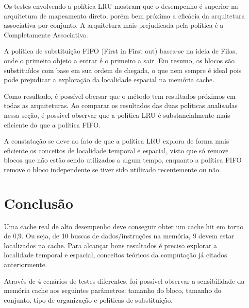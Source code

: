 \documentclass[conference]{IEEEtran}
\begin{document}
Os testes envolvendo a política LRU mostram que o desempenho é superior na arquitetura de mapeamento direto, porém bem próximo a eficácia da arquitetura associativa por conjunto. A arquitetura mais prejudicada pela política é a Completamente Associativa.


A política de substituição FIFO (First in First out) basea-se na ideia de Filas, onde o primeiro objeto a entrar é o primeiro a sair. Em resumo, os blocos são substituídos com base em sua ordem de chegada, o que nem sempre é ideal pois pode prejudicar a exploração da localidade espacial na memória cache.

Como resultado, é possível obersar que o método tem resultados próximos em todas as arquiteturas. Ao comparar os resultados das duas políticas analisadas nessa seção, é possível observar que a política LRU é substancialmente mais eficiente do que a política FIFO.

A constatação se deve ao fato de que a política LRU explora de forma mais eficiente os conceitos de localidade temporal e espacial, visto que só remove blocos que não estão sendo utilizados a algum tempo, enquanto a política FIFO remove o bloco independente se tiver sido utilizado recentemente ou não.

\section{Conclusão}
Uma cache real de alto desempenho deve conseguir obter um cache hit em torno de 0,9. Ou seja, de 10 buscas de dados/instruções na memória, 9 devem estar localizados na cache. Para alcançar bons resultados é preciso explorar a localidade temporal e espacial, conceitos teóricos da computação já citados anteriormente. 

Através de 4 cenários de testes diferentes, foi possível observar a sensibilidade da memória cache aos seguintes parâmetros: tamanho do bloco, tamanho do conjunto, tipo de organização e políticas de substituição.
\end{document}
